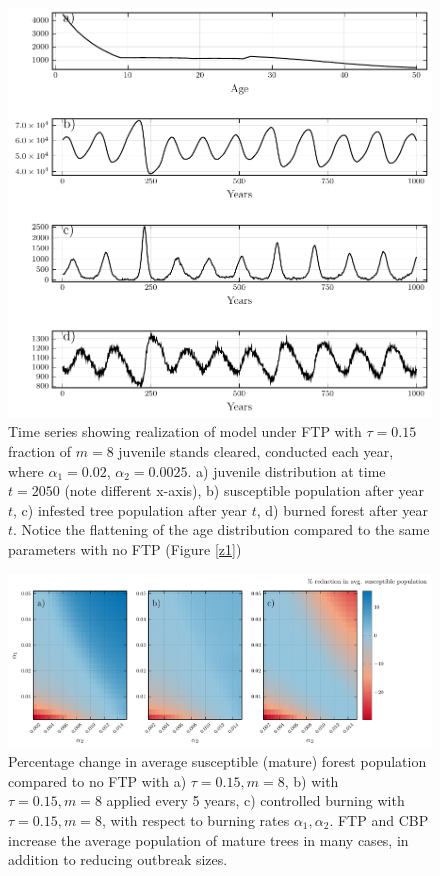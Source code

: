 \begin{figure}
  \includegraphics[width=\textwidth]{chapter_3/z1_ftp.pdf}
  \caption[Time series showing realization of model under FTP with $\tau = 0.15$ fraction of $m = 8$ juvenile stands cleared, conducted each year, where  $\alpha_1 = 0.02$, $\alpha_2 = 0.0025$.]{Time series showing realization of model under FTP with $\tau = 0.15$ fraction of $m = 8$ juvenile stands cleared, conducted each year, where  $\alpha_1 = 0.02$, $\alpha_2 = 0.0025$.  a) juvenile distribution at time $t=2050$ (note different x-axis), b) susceptible population after year $t$, c) infested tree population after year $t$, d) burned forest after year $t$.  Notice the flattening of the age distribution compared to the same parameters with no FTP (Figure \ref{z1})}
  \label{trim_ts}
\end{figure}

\begin{figure}
  \includegraphics[width=\textwidth]{chapter_3/a1_a2_trim_susceptible_loss.pdf}
  \caption[Percentage change in average susceptible (mature) forest population compared to no FTP.]{Percentage change in average susceptible (mature) forest population compared to no FTP with a) $\tau = 0.15, m = 8$, b) with $\tau = 0.15, m = 8$ applied every 5 years, c) controlled burning with $\tau = 0.15, m = 8$,  with respect to burning rates $\alpha_1,\alpha_2$. FTP and CBP increase the average population of mature trees in many cases, in addition to reducing outbreak sizes.}
  \label{trim_susceptible}
\end{figure}

